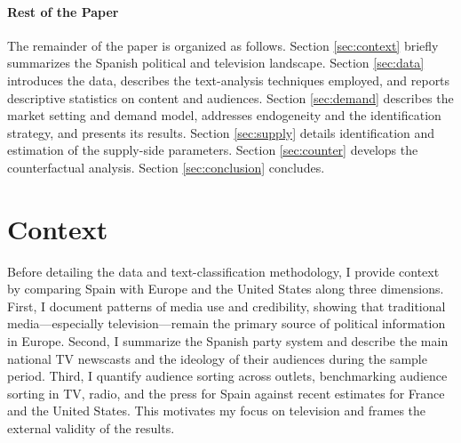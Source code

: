 \documentclass[12pt]{article}
\begin{document}

\paragraph{Rest of the Paper}

The remainder of the paper is organized as follows. Section \ref{sec:context} briefly summarizes the Spanish political and television landscape. Section \ref{sec:data} introduces the data, describes the text-analysis techniques employed, and reports descriptive statistics on content and audiences. Section \ref{sec:demand} describes the market setting and demand model, addresses endogeneity and the identification strategy, and presents its results. Section \ref{sec:supply} details identification and estimation of the supply-side parameters. Section \ref{sec:counter} develops the counterfactual analysis. Section \ref{sec:conclusion} concludes.

	
	
	\section{Context}
	
Before detailing the data and text-classification methodology, I provide context by comparing Spain with Europe and the United States along three dimensions. First, I document patterns of media use and credibility, showing that traditional media—especially television—remain the primary source of political information in Europe. Second, I summarize the Spanish party system and describe the main national TV newscasts and the ideology of their audiences during the sample period. Third, I quantify audience sorting across outlets, benchmarking audience sorting in TV, radio, and the press for Spain against recent estimates for France and the United States. This motivates my focus on television and frames the external validity of the results.
	
\end{document}
